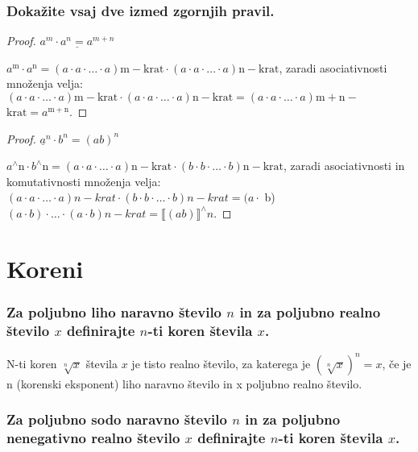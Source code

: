\documentclass{article}
\begin{document}
\subsubsection*{Dokažite vsaj dve izmed zgornjih pravil.}

\begin{proof}
    $\underline{a^{m} \cdot a^{n}=a^{m+n}}$

    $a^{\mathrm{m}} \cdot a^{\mathrm{n}}=(a \cdot a \cdot \ldots \cdot a) \mathrm{m}-\mathrm{krat} \cdot(a \cdot a \cdot \ldots \cdot a) \mathrm{n}-\mathrm{krat}$, zaradi asociativnosti množenja velja: $(a \cdot a \cdot \ldots \cdot a) \mathrm{m}-\mathrm{krat} \cdot(a \cdot a \cdot \ldots \cdot a) \mathrm{n}-\mathrm{krat}=(a \cdot a \cdot \ldots \cdot a) \mathrm{m}+\mathrm{n}-$ $\mathrm{krat}=a^{\mathrm{m}+\mathrm{n}}$.
\end{proof}

\begin{proof}
    $\underline{a}^{n} \cdot b^{n}=(a b)^{n}$

    $a^{\wedge} \mathrm{n} \cdot b^{\wedge} \mathrm{n}=(a \cdot a \cdot \ldots \cdot a) \mathrm{n}-\mathrm{krat} \cdot(b \cdot b \cdot \ldots \cdot b) \mathrm{n}-\mathrm{krat}$, zaradi asociativnosti in komutativnosti množenja velja: $(a \cdot a \cdot \ldots \cdot a) n-k r a t \cdot(b \cdot b \cdot \ldots \cdot b) n-k r a t=(a \cdot$ b) $(a \cdot b) \cdot \ldots \cdot(a \cdot b) n-k r a t=\llbracket(a b) \rrbracket^{\wedge} n$.
\end{proof}

\section{Koreni}
\subsubsection*{Za poljubno liho naravno število $n$ in za poljubno realno število $x$ definirajte $n$-ti koren števila $x$.}

N-ti koren $\sqrt[n]{x}$ števila $x$ je tisto realno število, za katerega je $(\sqrt[n]{x})^{n}=x$, če je $\mathrm{n}$ (korenski eksponent) liho naravno število in x poljubno realno število.

\subsubsection*{Za poljubno sodo naravno število $n$ in za poljubno nenegativno realno število $x$ definirajte $n$-ti koren števila $x$.}
\end{document}
